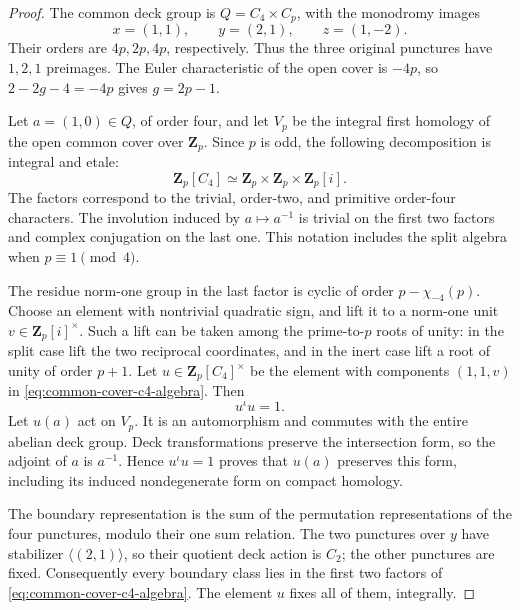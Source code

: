\begin{proof}
The common deck group is \(Q=C_4\times C_p\), with the
monodromy images
\[
                  x=(1,1),\qquad y=(2,1),\qquad z=(1,-2).
\]
Their orders are \(4p,2p,4p\), respectively. Thus the three
original punctures have \(1,2,1\) preimages. The Euler
characteristic of the open cover is \(-4p\), so
\(2-2g-4=-4p\) gives \(g=2p-1\).

Let \(a=(1,0)\in Q\), of order four, and let \(V_p\)
be the integral first homology of the open common cover over
\(\mathbf Z_p\). Since \(p\) is odd, the following decomposition
is integral and etale:
\begin{equation}
 \mathbf Z_p[C_4]
      \simeq\mathbf Z_p\times\mathbf Z_p\times\mathbf Z_p[i].
                                                        \label{eq:common-cover-c4-algebra}
\end{equation}
The factors correspond to the trivial, order-two, and primitive
order-four characters. The involution induced by \(a\mapsto a^{-1}\)
is trivial on the first two factors and complex conjugation on
the last one. This notation includes the split algebra when
\(p\equiv1\pmod4\).

The residue norm-one group in the last factor is cyclic of order
\(p-\chi_{-4}(p)\). Choose an element with nontrivial quadratic
sign, and lift it to a norm-one unit \(v\in\mathbf Z_p[i]^\times\).
Such a lift can be taken among the prime-to-\(p\) roots of unity:
in the split case lift the two reciprocal coordinates, and in
the inert case lift a root of unity of order \(p+1\).
Let \(u\in\mathbf Z_p[C_4]^\times\) be the element with
components \((1,1,v)\) in \eqref{eq:common-cover-c4-algebra}. Then
\[
                              u^\iota u=1.
\]
Let \(u(a)\) act on \(V_p\). It is an automorphism and
commutes with the entire abelian deck group. Deck transformations
preserve the intersection form, so the adjoint of \(a\) is
\(a^{-1}\). Hence \(u^\iota u=1\) proves that \(u(a)\)
preserves this form, including its induced nondegenerate form
on compact homology.

The boundary representation is the sum of the permutation
representations of the four punctures, modulo their one sum
relation. The two punctures over \(y\) have stabilizer
\(\langle(2,1)\rangle\), so their quotient deck action is
\(C_2\); the other punctures are fixed. Consequently every
boundary class lies in the first two factors of \eqref{eq:common-cover-c4-algebra}.
The element \(u\) fixes all of them, integrally.


\end{proof}
